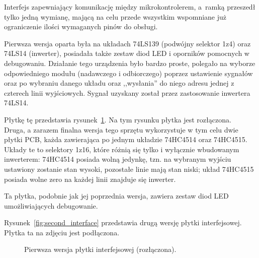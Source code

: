 Interfejs zapewniający komunikację między mikrokontrolerem, a~ram\-ką przeszedł tylko jedną wymianę, mającą na celu przede wszystkim wspomniane już ograniczenie ilości wymaganych pinów do obsługi.

Pierwsza wersja oparta była na układach 74LS139 (podwójny selektor 1\ppauza{}z\ppauza{}4) oraz 74LS14 (inwerter), posiadała także zestaw diod LED i oporników pomocnych w debugowaniu. Działanie tego urządzenia było bardzo proste, polegało na wyborze odpowiedniego modułu (nadawczego i odbiorczego) poprzez ustawienie sygnałów  oraz  po wybraniu danego układu oraz ,,wysłania'' do niego adresu jednej z czterech linii wyjściowych. Sygnał  uzyskany został przez zastosowanie inwertera 74LS14.

Płytkę tę przedstawia rysunek~\ref{fig:first_interface}.
Na tym rysunku płytka jest rozłączona.\\

Druga, a zarazem finalna wersja tego sprzętu wykorzystuje w tym celu dwie płytki PCB, każda zawierająca po jednym układzie 74HC4514 oraz 74HC4515. Układy te to selektory 1\ppauza{}z\ppauza{}16, które różnią się tylko i wyłącznie wbudowanym inwerterem: 74HC4514 posiada wolną jedynkę, tzn. na wybranym wyjściu ustawiony zostanie stan wysoki, pozostałe linie mają stan niski; układ 74HC4515 posiada wolne zero \pauza na każdej linii znajduje się inwerter.

Ta płytka, podobnie jak jej poprzednia wersja, zawiera zestaw diod LED umożliwiających debugowanie.

Rysunek~\ref{fig:second_interface} przedstawia drugą wersję płytki interfejsowej. Płytka ta na zdjęciu jest podłączona.\\

\begin{figure}
 \centering
 \caption[Pierwsza wersja płytki interfejsowej]{Pierwsza wersja płytki interfejsowej (rozłączona).}
 \label{fig:first_interface}
\end{figure}

